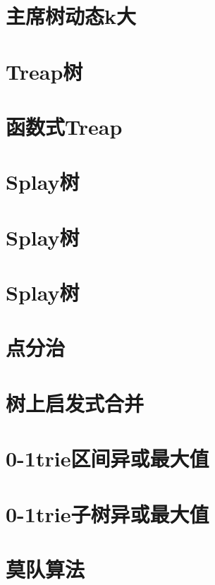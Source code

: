\section{主席树动态k大}
\raggedbottom
\hrulefill
\section{Treap树}
\raggedbottom
\hrulefill
\section{函数式Treap}
\raggedbottom
\hrulefill
\section{Splay树}
\raggedbottom
\hrulefill
\section{Splay树}
\raggedbottom
\hrulefill
\section{Splay树}
\raggedbottom
\hrulefill
\section{点分治}
\raggedbottom
\hrulefill
\section{树上启发式合并}
\raggedbottom
\hrulefill
\section{	0-1trie区间异或最大值}
\raggedbottom
\hrulefill
\section{	0-1trie子树异或最大值}
\raggedbottom
\hrulefill
\section{莫队算法}
\raggedbottom
\hrulefill
